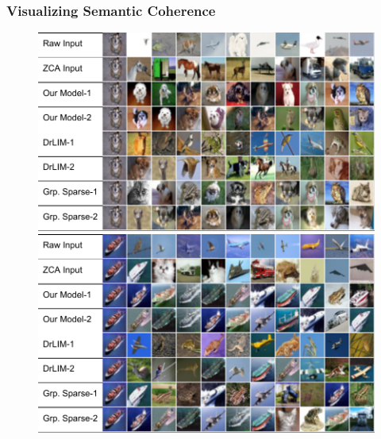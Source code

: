 \documentclass{beamer}
\begin{document}
\begin{frame}
\frametitle{Visualizing Semantic Coherence}
\begin{center} 
\begin{figure}
\includegraphics[scale=0.40]{./Figures/Project1/NNclass1.pdf}\\ \vspace{0.25cm} 
\includegraphics[scale=0.40]{./Figures/Project1/NNclass2.pdf}
\end{figure}
\end{center}  
\end{frame} 
\end{document}
